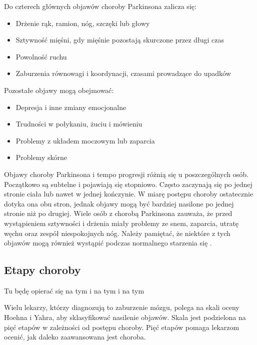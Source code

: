 Do czterech głównych objawów choroby Parkinsona zalicza się:
\begin{itemize}[itemsep=0.5pt]
	\item Drżenie rąk, ramion, nóg, szczęki lub głowy
	\item Sztywność mięśni, gdy mięśnie pozostają skurczone przez długi czas
	\item Powolność ruchu
	\item Zaburzenia równowagi i koordynacji, czasami prowadzące do upadków
\end{itemize}


Pozostałe objawy mogą obejmować:
\begin{itemize}[itemsep=0.5pt]
	\item Depresja i inne zmiany emocjonalne
	\item Trudności w połykaniu, żuciu i mówieniu
	\item Problemy z układem moczowym lub zaparcia
	\item Problemy skórne
\end{itemize}

Objawy choroby Parkinsona i tempo progresji różnią się u poszczególnych osób.
Początkowo są subtelne i pojawiają się stopniowo.
Często zaczynają się po jednej stronie ciała lub nawet w jednej kończynie.
W miarę postępu choroby ostatecznie dotyka ona obu stron, jednak objawy mogą być bardziej nasilone po jednej stronie niż po drugiej.
Wiele osób z chorobą Parkinsona zauważa, że przed wystąpieniem sztywności i drżenia miały problemy ze snem, zaparcia, utratę węchu oraz zespół niespokojnych nóg.
Należy pamiętać, że niektóre z tych objawów mogą również wystąpić podczas normalnego starzenia się \cite{National_Institute_on_Aging_2022}.


\subsection{Etapy choroby}
\label{subsec:etapy}

Tu będę opierać się na tym\cite{Szurek_2018} i na tym\cite{Wieczorek_2013} i na tym\cite{Kuryłowicz_2019}

Wielu lekarzy, którzy diagnozują to zaburzenie mózgu, polega na skali oceny Hoehna i Yahra, aby sklasyfikować nasilenie objawów.
Skala jest podzielona na pięć etapów w zależności od postępu choroby.
Pięć etapów pomaga lekarzom ocenić, jak daleko zaawansowana jest choroba.

